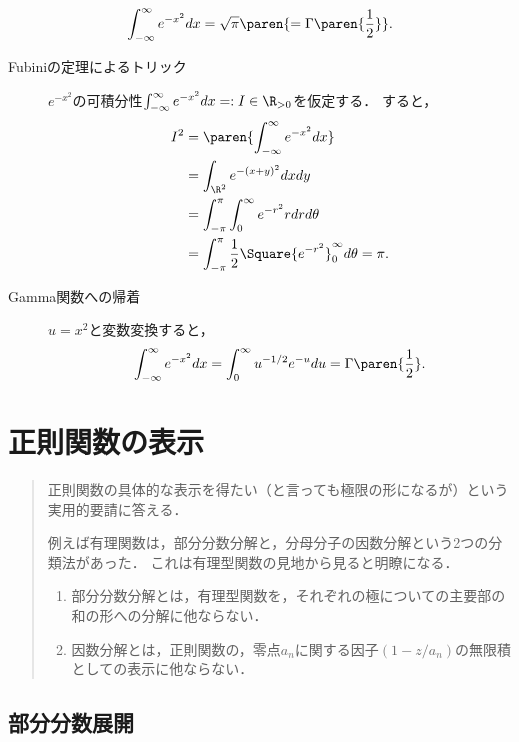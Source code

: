 \documentclass[uplatex, dvipdfmx]{jsreport}
\begin{document}
\begin{proposition}
    \[\int^\infty_{-\infty}e^{-x^2}dx=\sqrt{\pi}\paren{=\Gamma\paren{\frac{1}{2}}}.\]
\end{proposition}
\begin{Proof}\mbox{}
    \begin{description}
        \item[Fubiniの定理によるトリック] $e^{-x^2}$の可積分性$\int^\infty_{-\infty}e^{-x^2}dx=:I\in\R_{>0}$を仮定する．
        すると，
        \begin{align*}
            I^2&=\paren{\int^\infty_{-\infty}e^{-x^2}dx}\\
            &=\int_{\R^2}e^{-(x+y)^2}dxdy\\
            &=\int^\pi_{-\pi}\int^\infty_{0}e^{-r^2}rdrd\theta\\
            &=\int^\pi_{-\pi}\frac{1}{2}\Square{e^{-r^2}}^\infty_0d\theta=\pi.
        \end{align*}
        \item[Gamma関数への帰着] $u=x^2$と変数変換すると，
        \[\int^\infty_{-\infty}e^{-x^2}dx=\int^\infty_0u^{-1/2}e^{-u}du=\Gamma\paren{\frac{1}{2}}.\]
    \end{description}
\end{Proof}

\chapter{正則関数の表示}

\begin{quotation}
    正則関数の具体的な表示を得たい（と言っても極限の形になるが）という実用的要請に答える．

    例えば有理関数は，部分分数分解と，分母分子の因数分解という2つの分類法があった．
    これは有理型関数の見地から見ると明瞭になる．
    \begin{enumerate}
        \item 部分分数分解とは，有理型関数を，それぞれの極についての主要部の和の形への分解に他ならない．
        \item 因数分解とは，正則関数の，零点$a_n$に関する因子$(1-z/a_n)$の無限積としての表示に他ならない．
    \end{enumerate}
\end{quotation}

\section{部分分数展開}
\end{document}
